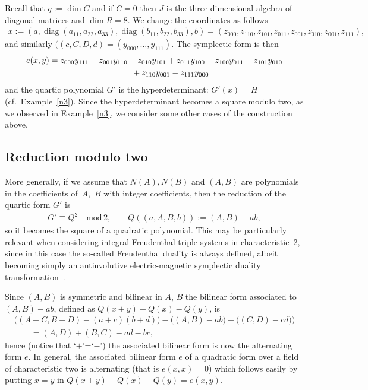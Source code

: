 \documentclass[pdftex]{sigma}
\numberwithin{equation}{section}
\begin{document}
\begin{Example}[$q=0$] \label{q=0}
Recall that $q:=\dim C$ and if $C=0$ then $J$ is the three-dimensional algebra of diagonal matrices and $\dim R=8$. We change the coordinates as follows
\begin{gather*}
x:= (a,\operatorname{diag}(a_{11},a_{22},a_{33}),\operatorname{diag}(b_{11},b_{22},b_{33}),b) =(z_{000},z_{110},z_{101},z_{011},z_{001},z_{010},z_{001},z_{111}),
\end{gather*}
and similarly $((c,C,D,d)=(y_{000},\ldots,y_{111})$. The symplectic form is then
\begin{gather*}
e(x,y) =z_{000} y_{111} - z_{001} y_{110} - z_{010} y_{101} + z_{011} y_{100} - z_{100} y_{011} + z_{101} y_{010} \\
\hphantom{e(x,y) =}{}+ z_{110} y_{001} - z_{111} y_{000}
\end{gather*}
and the quartic polynomial $G'$ is the hyperdeterminant: $G'(x)=H$ (cf.\ Example~\ref{n3}). Since the hyperdeterminant becomes a square modulo two, as we observed in Example~\ref{n3}, we consider some other cases of the construction above.
\end{Example}

\subsection{Reduction modulo two}
More generally, if we assume that $N(A),N(B)$ and $(A,B)$ are polynomials in the coefficients of~$A$,~$B$ with integer coefficients, then the reduction of the quartic form $G'$ is
\begin{gather*}
G'\equiv Q^2\quad\text{mod}\, 2,\qquad Q((a,A,B,b)) := (A,B)-ab,
\end{gather*}
so it becomes the square of a quadratic polynomial. This may be particularly relevant when considering integral Freudenthal triple systems in characteristic~2, since in this case the so-called Freudenthal duality is always defined, albeit becoming simply an antinvolutive electric-magnetic symplectic duality transformation~\cite{BDDR,FKM}.

Since $(A,B)$ is symmetric and bilinear in $A$, $B$ the bilinear form associated to $(A,B)-ab$, defined as $Q(x+y)-Q(x)-Q(y)$, is
\begin{gather*}
\big((A+C,B+D)-(a+c)(b+d)\big) - \big((A,B)-ab\big) - \big((C,D)-cd)\big)\\
\qquad{} = (A,D) + (B,C) - ad - bc,
\end{gather*}
hence (notice that `$+$'=`$-$') the associated bilinear form is now the alternating form $e$. In general, the associated bilinear form $e$ of a quadratic form over a field of
characteristic two is alternating (that is $e(x,x)=0$) which follows easily by putting $x=y$ in $Q(x+y)-Q(x)-Q(y)=e(x,y)$.
\end{document}
